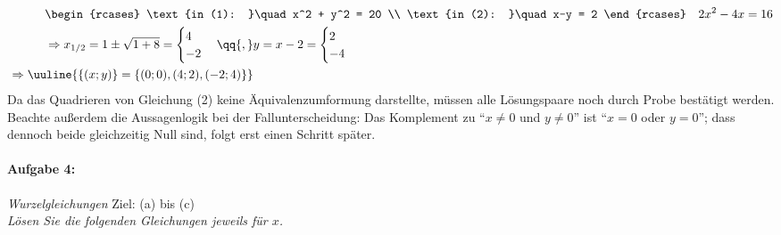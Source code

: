 \begin{enumerate}[label={(\alph*)}]
\begin{align}
        &\qquad\quad\begin{rcases}
            \text{in (1): }\quad x^2 + y^2 = 20 \\
            \text{in (2): }\quad x-y = 2
        \end{rcases} \quad 2x^2 - 4x = 16 \\
        &\qquad \quad\Rightarrow x_{1/2} = 1 \pm \sqrt{1+8} = \begin{cases}
            4 \\ -2
        \end{cases} \qq{,} y= x-2 = \begin{cases}
            2\\-4
        \end{cases}\\
        &\Rightarrow \uuline{\{(x;y)\} = \{(0;0), (4;2),(-2;4)\}}
    \end{align}
    Da das Quadrieren von Gleichung (2) keine Äquivalenzumformung darstellte, müssen alle Lösungspaare noch durch Probe bestätigt werden.\\
    Beachte außerdem die Aussagenlogik bei der Fallunterscheidung: Das Komplement zu ``$x\neq 0$ und $y \neq 0$'' ist ``$x=0$ oder $y=0$''; dass dennoch beide gleichzeitig Null sind, folgt erst einen Schritt später.
\end{enumerate}

\paragraph{Aufgabe 4: } \emph{Wurzelgleichungen} \hfill Ziel: (a) bis (c)\\[0.2cm]
\emph{Lösen Sie die folgenden Gleichungen jeweils für $x$.}

